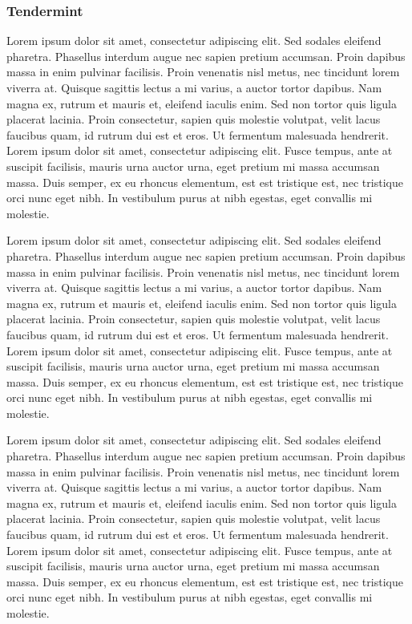 \subsubsection{Tendermint}
Lorem ipsum dolor sit amet, consectetur adipiscing elit. Sed sodales
eleifend pharetra. Phasellus interdum augue nec sapien pretium accumsan.
Proin dapibus massa in enim pulvinar facilisis. Proin venenatis nisl metus,
nec tincidunt lorem viverra at. Quisque sagittis lectus a mi varius, a
auctor tortor dapibus. Nam magna ex, rutrum et mauris et, eleifend iaculis
enim. Sed non tortor quis ligula placerat lacinia. Proin consectetur, sapien
quis molestie volutpat, velit lacus faucibus quam, id rutrum dui est et
eros. Ut fermentum malesuada hendrerit. Lorem ipsum dolor sit amet,
consectetur adipiscing elit. Fusce tempus, ante at suscipit facilisis,
mauris urna auctor urna, eget pretium mi massa accumsan massa. Duis semper,
ex eu rhoncus elementum, est est tristique est, nec tristique orci nunc eget
nibh. In vestibulum purus at nibh egestas, eget convallis mi molestie.

Lorem ipsum dolor sit amet, consectetur adipiscing elit. Sed sodales
eleifend pharetra. Phasellus interdum augue nec sapien pretium accumsan.
Proin dapibus massa in enim pulvinar facilisis. Proin venenatis nisl metus,
nec tincidunt lorem viverra at. Quisque sagittis lectus a mi varius, a
auctor tortor dapibus. Nam magna ex, rutrum et mauris et, eleifend iaculis
enim. Sed non tortor quis ligula placerat lacinia. Proin consectetur, sapien
quis molestie volutpat, velit lacus faucibus quam, id rutrum dui est et
eros. Ut fermentum malesuada hendrerit. Lorem ipsum dolor sit amet,
consectetur adipiscing elit. Fusce tempus, ante at suscipit facilisis,
mauris urna auctor urna, eget pretium mi massa accumsan massa. Duis semper,
ex eu rhoncus elementum, est est tristique est, nec tristique orci nunc eget
nibh. In vestibulum purus at nibh egestas, eget convallis mi molestie.

Lorem ipsum dolor sit amet, consectetur adipiscing elit. Sed sodales
eleifend pharetra. Phasellus interdum augue nec sapien pretium accumsan.
Proin dapibus massa in enim pulvinar facilisis. Proin venenatis nisl metus,
nec tincidunt lorem viverra at. Quisque sagittis lectus a mi varius, a
auctor tortor dapibus. Nam magna ex, rutrum et mauris et, eleifend iaculis
enim. Sed non tortor quis ligula placerat lacinia. Proin consectetur, sapien
quis molestie volutpat, velit lacus faucibus quam, id rutrum dui est et
eros. Ut fermentum malesuada hendrerit. Lorem ipsum dolor sit amet,
consectetur adipiscing elit. Fusce tempus, ante at suscipit facilisis,
mauris urna auctor urna, eget pretium mi massa accumsan massa. Duis semper,
ex eu rhoncus elementum, est est tristique est, nec tristique orci nunc eget
nibh. In vestibulum purus at nibh egestas, eget convallis mi molestie.

